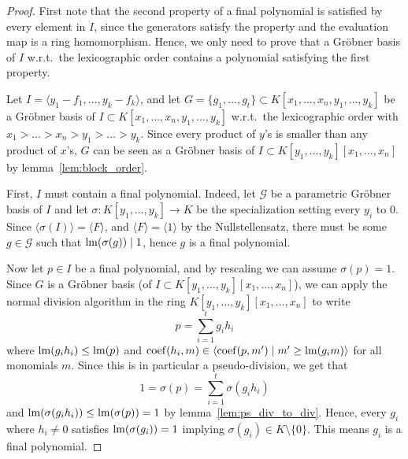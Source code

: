 \indent \begin{proof}
  First note that the second property of a final polynomial is satisfied by every element in $I$, since the generators satisfy the property and the evaluation map is a ring homomorphism. Hence, we only need to prove that a Gröbner basis of $I$ w.r.t.\ the lexicographic order contains a polynomial satisfying the first property.

  Let $I = \langle y_{1} - f_{1}, \dots, y_{k} - f_{k} \rangle$, and let $G = \{g_{1}, \dots, g_{t}\} \subset K[x_{1}, \dots, x_{n}, y_{1}, \dots, y_{k}]$ be a Gröbner basis of $I \subset K[x_{1}, \dots, x_{n}, y_{1}, \dots, y_{k}]$ w.r.t.\ the lexicographic order with $x_{1} > \dots > x_{n} > y_{1} > \dots > y_{k}$. Since every product of $y$'s is smaller than any product of $x$'s, $G$ can be seen as a Gröbner basis of $I \subset K[y_{1}, \dots, y_{k}][x_{1}, \dots, x_{n}]$ by lemma~\ref{lem:block_order}.

  First, $I$ must contain a final polynomial. Indeed, let $\mathcal G$ be a parametric Gröbner basis of $I$ and let $\sigma : K[y_{1}, \dots, y_{k}] \to K$ be the specialization setting every $y_{i}$ to 0. Since $\langle \sigma(I) \rangle = \langle F \rangle$, and $\langle F \rangle = \langle 1 \rangle$ by the Nullstellensatz, there must be some $g \in \mathcal G$ such that $\operatorname{lm}(\sigma(g)) \mid 1$, hence $g$ is a final polynomial.

  Now let $p \in I$ be a final polynomial, and by rescaling we can assume $\sigma(p) = 1$. Since $G$ is a Gröbner basis (of $I \subset K[y_{1}, \dots, y_{k}][x_{1}, \dots, x_{n}]$), we can apply the normal division algorithm in the ring $K[y_{1}, \dots, y_{k}][x_{1}, \dots, x_{n}]$ to write
  \[p = \sum_{i=1}^{t} g_{i} h_{i}\]
  where $\operatorname{lm}(g_{i}h_{i}) \leq \operatorname{lm}(p)$ and $\operatorname{coef}(h_{i}, m) \in \langle \operatorname{coef}(p, m') \mid m' \geq \operatorname{lm}(g_{i}m) \rangle$ for all monomials $m$. Since this is in particular a pseudo-division, we get that
  \[1 = \sigma(p) = \sum_{i=1}^{t} \sigma(g_{i} h_{i})\]
  and $\operatorname{lm}(\sigma(g_{i} h_{i})) \leq \operatorname{lm}(\sigma(p)) = 1$ by lemma~\ref{lem:ps_div_to_div}. Hence, every $g_{i}$ where $h_{i} \neq 0$ satisfies $\operatorname{lm}(\sigma(g_{i})) = 1$ implying $\sigma(g_{i}) \in K \setminus \{0\}$. This means $g_{i}$ is a final polynomial.
\end{proof}



